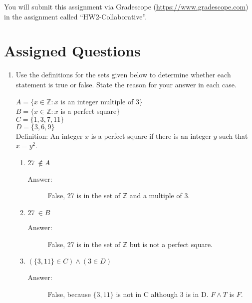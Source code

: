 \documentclass[12pt, oneside]{article}
\begin{document}
You will submit this assignment via Gradescope
(\href{https://www.gradescope.com}{https://www.gradescope.com}) in the assignment called ``HW2-Collaborative''.

\section*{Assigned Questions}

\begin{enumerate}

\item Use the definitions for the sets given below to determine whether each statement is true or false. State the reason for your answer in each case.

$A = \{ x \in \mathbb{Z}: x$ is an integer multiple of $3 \}$\\
$B = \{ x \in \mathbb{Z}: x$ is a perfect square$\}$\\
$C = \{1, 3, 7, 11\}$\\
$D = \{3, 6, 9\}$\\

Definition: An integer $x$ is a perfect square if there is an integer $y$ such that $x = y^2$.

\begin{enumerate}
    \item $27 ~\notin A$ 
    \begin{description}
        \item[Answer:] False, 27 is in the set of $\mathbb{Z}$ and a multiple of 3.
    \end{description}
    \item $27 ~\in B$ 
    \begin{description}
        \item[Answer:] False, 27 is in the set of $\mathbb{Z}$ but is not a perfect square.
    \end{description}
    \item $(\{3, 11\} \in C) \land (3 \in D)$ 
    \begin{description}
        \item[Answer:] False, because $\{3,11\}$ is not in C although 3 is in D. $F \land T$ is $F$.
    \end{description}
    
\end{enumerate}




\end{enumerate}
\end{document}
